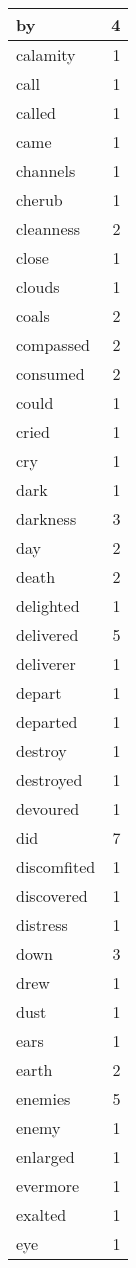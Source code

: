 \begin{center}
\begin{longtable}{l|r}
by & 4 \\ \hline
calamity & 1 \\ \hline
call & 1 \\ \hline
called & 1 \\ \hline
came & 1 \\ \hline
channels & 1 \\ \hline
cherub & 1 \\ \hline
cleanness & 2 \\ \hline
close & 1 \\ \hline
clouds & 1 \\ \hline
coals & 2 \\ \hline
compassed & 2 \\ \hline
consumed & 2 \\ \hline
could & 1 \\ \hline
cried & 1 \\ \hline
cry & 1 \\ \hline
dark & 1 \\ \hline
darkness & 3 \\ \hline
day & 2 \\ \hline
death & 2 \\ \hline
delighted & 1 \\ \hline
delivered & 5 \\ \hline
deliverer & 1 \\ \hline
depart & 1 \\ \hline
departed & 1 \\ \hline
destroy & 1 \\ \hline
destroyed & 1 \\ \hline
devoured & 1 \\ \hline
did & 7 \\ \hline
discomfited & 1 \\ \hline
discovered & 1 \\ \hline
distress & 1 \\ \hline
down & 3 \\ \hline
drew & 1 \\ \hline
dust & 1 \\ \hline
ears & 1 \\ \hline
earth & 2 \\ \hline
enemies & 5 \\ \hline
enemy & 1 \\ \hline
enlarged & 1 \\ \hline
evermore & 1 \\ \hline
exalted & 1 \\ \hline
eye & 1 \\ \hline

\end{longtable}
\end{center}
